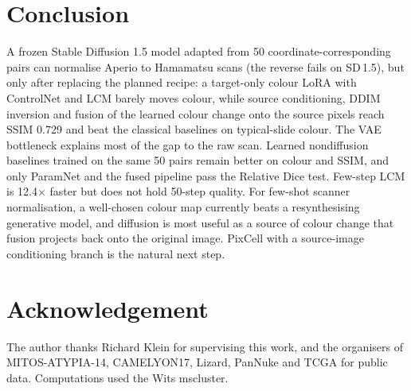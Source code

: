 \section{Conclusion}
\label{sec:conclusion}

A frozen Stable Diffusion 1.5 model adapted from 50 coordinate-corresponding pairs can normalise Aperio
to Hamamatsu scans (the reverse fails on SD\,1.5), but only after replacing the planned recipe: a target-only colour LoRA with ControlNet and
LCM barely moves colour, while source conditioning, DDIM inversion and fusion of the learned colour change
onto the source pixels reach SSIM 0.729 and beat the classical baselines on typical-slide colour. The VAE
bottleneck explains most of the gap to the raw scan. Learned nondiffusion baselines trained on the same 50 pairs remain better on colour and SSIM,
and only ParamNet and the fused pipeline pass the Relative Dice test. Few-step LCM is 12.4$\times$ faster but does not hold 50-step quality. For
few-shot scanner normalisation, a well-chosen colour map currently beats a resynthesising generative
model, and diffusion is most useful as a source of colour change that fusion projects back onto the
original image. PixCell with a source-image conditioning branch is the natural next step.

\section*{Acknowledgement}
The author thanks Richard Klein for supervising this work, and the organisers of MITOS-ATYPIA-14,
CAMELYON17, Lizard, PanNuke and TCGA for public data. Computations used the Wits mscluster.
